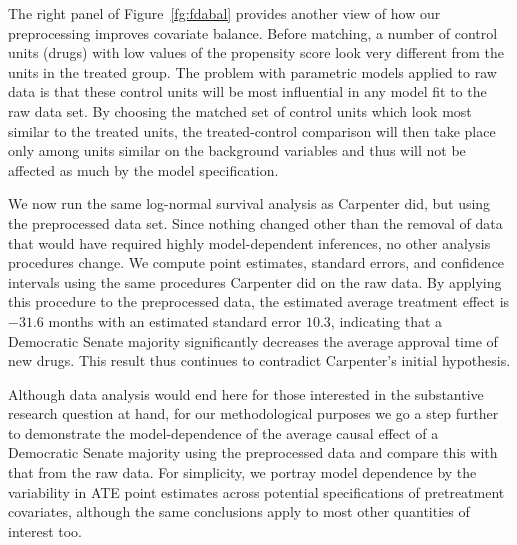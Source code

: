 \documentclass[11pt,titlepage]{article}
\begin{document}
The right panel of Figure~\ref{fg:fdabal} provides another view of how
our preprocessing improves covariate balance.  Before matching, a
number of control units (drugs) with low values of the propensity
score look very different from the units in the treated group.  The
problem with parametric models applied to raw data is that these
control units will be most influential in any model fit to the raw
data set.  By choosing the matched set of control units which look
most similar to the treated units, the treated-control comparison will
then take place only among units similar on the background variables and thus
will not be affected as much by the model specification.

We now run the same log-normal survival analysis as Carpenter did, but
using the preprocessed data set.  Since nothing changed other than the
removal of data that would have required highly model-dependent
inferences, no other analysis procedures change.  We compute point
estimates, standard errors, and confidence intervals using the same
procedures Carpenter did on the raw data.  By applying this procedure
to the preprocessed data, the estimated average treatment effect is
$-31.6$ months with an estimated standard error $10.3$, indicating
that a Democratic Senate majority significantly decreases the average
approval time of new drugs.  This result thus continues to contradict
Carpenter's initial hypothesis.

Although data analysis would end here for those interested in the
substantive research question at hand, for our methodological purposes
we go a step further to demonstrate the model-dependence of the
average causal effect of a Democratic Senate majority using the
preprocessed data and compare this with that from the raw data.  For
simplicity, we portray model dependence by the variability in ATE
point estimates across potential specifications of pretreatment
covariates, although the same conclusions apply to most other
quantities of interest too.
\end{document}
